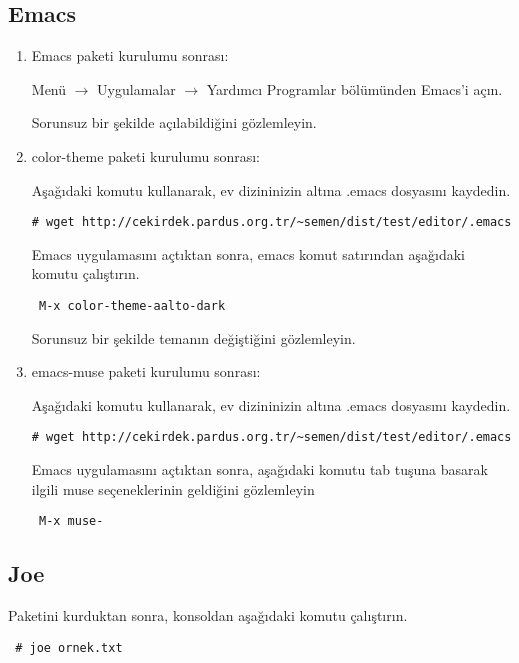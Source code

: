 \documentclass[a4paper,10pt]{article}
\begin{document}
\subsection*{Emacs}
\begin{enumerate}
\item Emacs paketi kurulumu sonrası:

Menü $\rightarrow$ Uygulamalar $\rightarrow$ Yardımcı Programlar bölümünden Emacs'i açın.

Sorunsuz bir şekilde açılabildiğini gözlemleyin.

\item color-theme paketi kurulumu sonrası:


Aşağıdaki komutu kullanarak, ev dizininizin altına .emacs dosyasını kaydedin.
\begin{verbatim}
# wget http://cekirdek.pardus.org.tr/~semen/dist/test/editor/.emacs 
\end{verbatim}

Emacs uygulamasını açtıktan sonra, emacs komut satırından aşağıdaki komutu çalıştırın.
\begin{verbatim}
 M-x color-theme-aalto-dark
\end{verbatim}

Sorunsuz bir şekilde temanın değiştiğini gözlemleyin.

\item emacs-muse paketi kurulumu sonrası:

Aşağıdaki komutu kullanarak, ev dizininizin altına .emacs dosyasını kaydedin.
\begin{verbatim}
# wget http://cekirdek.pardus.org.tr/~semen/dist/test/editor/.emacs 
\end{verbatim}

Emacs uygulamasını açtıktan sonra, aşağıdaki komutu tab tuşuna basarak ilgili muse seçeneklerinin geldiğini gözlemleyin
\begin{verbatim}
 M-x muse-
\end{verbatim}


\end{enumerate}


\subsection*{Joe}

Paketini kurduktan sonra, konsoldan aşağıdaki komutu çalıştırın.

\begin{verbatim}
 # joe ornek.txt
\end{verbatim}
\end{document}
